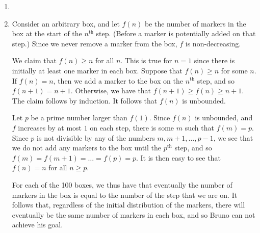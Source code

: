 \documentclass[12pt]{article}
\begin{document}
\begin{enumerate}
%


\item %


\item %
Consider an arbitrary box, and let $f(n)$ be the number of markers in the box at
the start of the $n^\text{th}$ step. (Before a marker is potentially added on
that step.) Since we never remove a marker from the box, $f$ is non-decreasing.

We claim that $f(n) \geq n$ for all $n$. This is true for $n = 1$ since there is
initially at least one marker in each box. Suppose that $f(n) \geq n$ for some
$n$. If $f(n) = n$, then we add a marker to the box on the $n^\text{th}$ step,
and so $f(n + 1) = n + 1$. Otherwise, we have that $f(n + 1) \geq f(n) \geq n +
1$. The claim follows by induction. It follows that $f(n)$ is unbounded.

Let $p$ be a prime number larger than $f(1)$. Since $f(n)$ is unbounded, and $f$
increases by at most $1$ on each step, there is some $m$ such that $f(m) = p$.
Since $p$ is not divisible by any of the numbers $m, m + 1, \dots, p - 1$, we
see that we do not add any markers to the box until the $p^\text{th}$ step, and
so $f(m) = f(m + 1) = \dots = f(p) = p$. It is then easy to see that $f(n) = n$
for all $n \geq p$.

For each of the 100 boxes, we thus have that eventually the number of markers
in the box is equal to the number of the step that we are on. It follows that,
regardless of the initial distribution of the markers, there will
eventually be the same number of markers in each box, and so Bruno can not
achieve his goal.


\end{enumerate}
\end{document}
